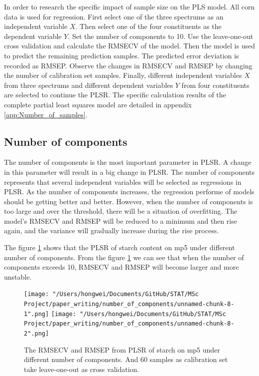 \documentclass[a4paper,12pt,titlepage]{article} %
\numberwithin{equation}{section}  %
\begin{document}
	In order to research the specific impact of sample size on the PLS model. All corn data is used for regression.
	First select one of the three spectrums as an independent variable $X$. Then select one of the four constituents as the dependent variable $Y$. Set the number of components to 10. Use the leave-one-out cross validation and calculate the RMSECV of the model. Then the model is used to predict the remaining prediction samples. The predicted error deviation is recorded as RMSEP. Observe the changes in RMSECV and RMSEP by changing the number of calibration set samples. Finally, different independent variables $X$ from three spectrums and different dependent variables $Y$ from four constituents are selected to continue the PLSR. The specific calculation results of the complete partial least squares model are detailed in appendix \ref{app:Number_of_samples}.
	
	\subsection{Number of components}
	\label{sec:Number of Components}
	
	The number of components is the most important parameter in PLSR. A change in this parameter will result in a big change in PLSR. The number of components represents that several independent variables will be selected as regressions in PLSR. As the number of components increases, the regression performe of models should be getting better and better. However, when the number of components is too large and over the threshold, there will be a situation of overfitting. The model's RMSECV and RMSEP will be reduced to a minimum and then rise again, and the variance will gradually increase during the rise process.
	
	The figure \ref{fig:component_1} shows that the PLSR of starch content on mp5 under different number of components. From the figure \ref{fig:component_1} we can see that when the number of components exceeds 10, RMSECV and RMSEP will become larger and more unstable.
	
		\begin{figure}[h]    %
		\centering           %
		\texttt{[image: "/Users/hongwei/Documents/GitHub/STAT/MSc Project/paper\_writing/number\_of\_components/unnamed-chunk-8-1".png]}  %
		\texttt{[image: "/Users/hongwei/Documents/GitHub/STAT/MSc Project/paper\_writing/number\_of\_components/unnamed-chunk-8-2".png]}  %
		\caption{The RMSECV and RMSEP from PLSR of starch on mp5 under different number of components. And 60 samples as calibration set take leave-one-out as cross validation.}          %
		\label{fig:component_1}               %
	\end{figure}                        %
	
\end{document}
